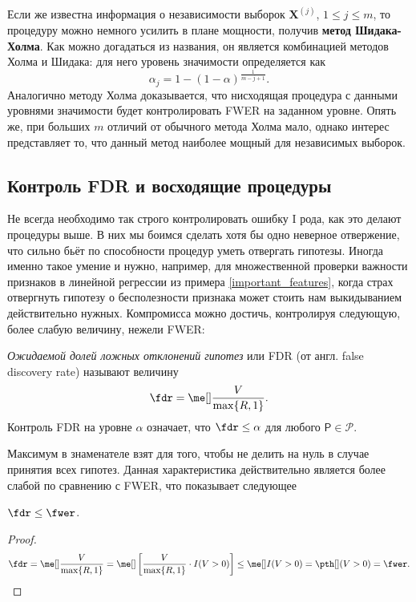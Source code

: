 Если же известна информация о независимости выборок $\mathbf X^{(j)}$, $1 \le j \le m$, то процедуру можно немного усилить в плане мощности, получив \textbf{метод Шидака-Холма}. Как можно догадаться из названия, он является комбинацией методов Холма и Шидака: для него уровень значимости определяется как
\[
\alpha_j = 1 - (1 - \alpha)^{\frac{1}{m-j+1}}.
\]
Аналогично методу Холма доказывается, что нисходящая процедура с данными уровнями значимости будет контролировать FWER на заданном уровне. Опять же, при больших $m$ отличий от обычного метода Холма мало, однако интерес представляет то, что данный метод наиболее мощный для независимых выборок.

\subsection{Контроль FDR и восходящие процедуры}

Не всегда необходимо так строго контролировать ошибку I рода, как это делают процедуры выше. В них мы боимся сделать хотя бы одно неверное отвержение, что сильно бьёт по способности процедур уметь отвергать гипотезы. Иногда именно такое умение и нужно, например, для множественной проверки важности признаков в линейной регрессии из примера \ref{important_features}, когда страх отвергнуть гипотезу о бесполезности признака может стоить нам выкидыванием действительно нужных. Компромисса можно достичь, контролируя следующую, более слабую величину, нежели FWER:

\begin{definition}
    \textit{Ожидаемой долей ложных отклонений гипотез} или FDR (от англ. \textsf{false discovery rate}) называют величину
    \[
    \fdr = \me[] \frac{V}{\max\{R, 1\}}.
    \]
    Контроль FDR на уровне $\alpha$ означает, что $\fdr \le \alpha$ для любого $\mathsf{P} \in \mathcal{P}$.
\end{definition}

Максимум в знаменателе взят для того, чтобы не делить на нуль в случае принятия всех гипотез. Данная характеристика действительно является более слабой по сравнению с FWER, что показывает следующее
\begin{proposition}
    $\fdr \le \fwer$.
\end{proposition}

\begin{proof}
    \begin{gather*}
        \fdr = \me[] \frac{V}{\max\{R, 1\}} = \me[] \left[ \frac{V}{\max\{R, 1\}} \cdot I(V > 0) \right] \le \me[] I(V > 0) = \pth[](V > 0) = \fwer.
    \end{gather*}
\end{proof}

